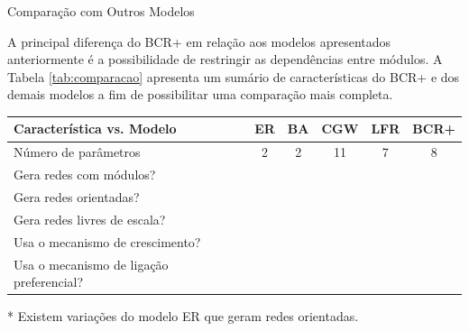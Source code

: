\begin{section}{Comparação com Outros Modelos}
	
	A principal diferença do BCR+ em relação aos modelos apresentados anteriormente é a possibilidade de restringir as dependências entre módulos. A Tabela \ref{tab:comparacao} apresenta um sumário de características do BCR+ e dos demais modelos a fim de possibilitar uma comparação mais completa.

\renewcommand{\S}{\CheckmarkBold}
\newcommand{\N}{\XSolidBrush}
	
\begin{threeparttable}
	\begin{center}
	\caption{Características do modelo BCR+ comparadas com características de outros modelos.}
	\label{tab:comparacao}
	\centering
	\begin{tabular}{|l|c|c|c|c|c|}
		\hline
		\textbf{Característica vs. Modelo} & \textbf{ER} & \textbf{BA} & \textbf{CGW} & \textbf{LFR} & \textbf{BCR+} \\
		\hline
		\hline
		Número de parâmetros                      & 2  &  2 & 11  & 7   &  8 \\
		\hline
		Gera redes com módulos?                   & \N & \N & \S & \S & \S \\
		\hline
		Gera redes orientadas?                    & \N\tnote{*} & \N & \S & \S & \S \\ \hline
		Gera redes livres de escala?              & \N & \S & \S & \S & \S \\
		\hline
		Usa o mecanismo de crescimento?           & \N & \S & \S & \N & \S \\
		\hline
		Usa o mecanismo de ligação preferencial?  & \N & \S & \S & \N & \S \\		
	  \hline
	\end{tabular}
	\begin{tablenotes}
	\item[*] Existem variações do modelo ER que geram redes orientadas.
	\end{tablenotes}	
	\end{center}
\end{threeparttable}


\end{section}
